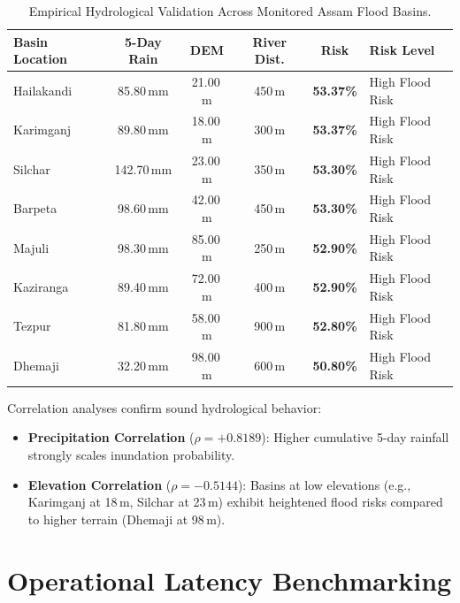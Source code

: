 \documentclass[12pt,a4paper,oneside]{report}
\begin{document}
\begin{table}[H]
\centering
\caption{Empirical Hydrological Validation Across Monitored Assam Flood Basins.}
\label{tab:hydrological_val}
\begin{tabularx}{\textwidth}{lccccX}
\toprule
\textbf{Basin Location} & \textbf{5-Day Rain} & \textbf{DEM} & \textbf{River Dist.} & \textbf{Risk} & \textbf{Risk Level} \\
\midrule
Hailakandi & 85.80\,mm & 21.00\,m & 450\,m & \textbf{53.37\%} & High Flood Risk \\
Karimganj & 89.80\,mm & 18.00\,m & 300\,m & \textbf{53.37\%} & High Flood Risk \\
Silchar & 142.70\,mm & 23.00\,m & 350\,m & \textbf{53.30\%} & High Flood Risk \\
Barpeta & 98.60\,mm & 42.00\,m & 450\,m & \textbf{53.30\%} & High Flood Risk \\
Majuli & 98.30\,mm & 85.00\,m & 250\,m & \textbf{52.90\%} & High Flood Risk \\
Kaziranga & 89.40\,mm & 72.00\,m & 400\,m & \textbf{52.90\%} & High Flood Risk \\
Tezpur & 81.80\,mm & 58.00\,m & 900\,m & \textbf{52.80\%} & High Flood Risk \\
Dhemaji & 32.20\,mm & 98.00\,m & 600\,m & \textbf{50.80\%} & High Flood Risk \\
\bottomrule
\end{tabularx}
\end{table}

Correlation analyses confirm sound hydrological behavior:
\begin{itemize}
    \item \textbf{Precipitation Correlation} ($\rho = +0.8189$): Higher cumulative 5-day rainfall strongly scales inundation probability.
    \item \textbf{Elevation Correlation} ($\rho = -0.5144$): Basins at low elevations (e.g., Karimganj at 18\,m, Silchar at 23\,m) exhibit heightened flood risks compared to higher terrain (Dhemaji at 98\,m).
\end{itemize}

\chapter{Operational Latency Benchmarking}
\label{chap:latency}
\end{document}
